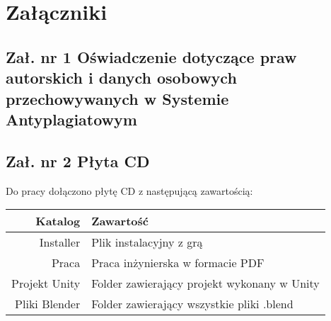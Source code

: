 \chapter*{Załączniki}
\section*{Zał. nr 1  Oświadczenie dotyczące praw autorskich i danych osobowych przechowywanych w Systemie Antyplagiatowym}

\section*{Zał. nr 2 Płyta CD}
\centering
Do pracy dołączono płytę CD z następującą zawartością: 
\hfill \break
\hfill \break
\begin{tabular}{|r|l|} \hline
Katalog & Zawartość \\ \hline
Installer & Plik instalacyjny z grą \\
Praca & Praca inżynierska w formacie PDF \\
Projekt Unity & Folder zawierający projekt wykonany w Unity \\
Pliki Blender & Folder zawierający wszystkie pliki .blend \\ \hline

\end{tabular}




